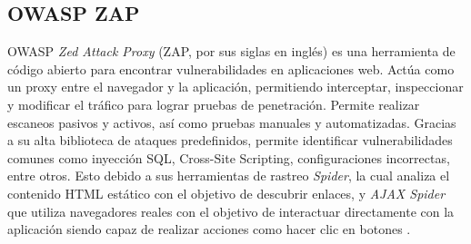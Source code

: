 \subsection{OWASP ZAP}
OWASP \textit{Zed Attack Proxy} (ZAP, por sus siglas en inglés) es una herramienta de código abierto para encontrar vulnerabilidades en
aplicaciones web. Actúa como un proxy entre el navegador y la aplicación, permitiendo interceptar, inspeccionar y modificar el tráfico
para lograr pruebas de penetración. Permite realizar escaneos pasivos y activos, así como pruebas manuales y automatizadas. Gracias a su
alta biblioteca de ataques predefinidos, permite identificar vulnerabilidades comunes como inyección SQL, Cross-Site Scripting, configuraciones
incorrectas, entre otros. Esto debido a sus herramientas de rastreo \textit{Spider}, la cual analiza el contenido HTML estático con el objetivo
de descubrir enlaces, y \textit{AJAX Spider} que utiliza navegadores reales con el objetivo de interactuar directamente con la aplicación siendo
capaz de realizar acciones como hacer clic en botones \cite{owasp2026documentation}.
